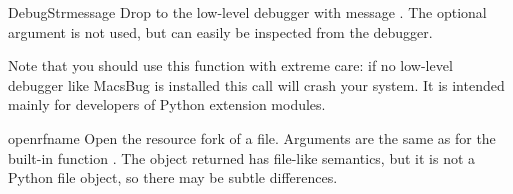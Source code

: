 \begin{funcdesc}{DebugStr}{message }
Drop to the low-level debugger with message . The
optional  argument is not used, but can easily be
inspected from the debugger.

Note that you should use this function with extreme care: if no
low-level debugger like MacsBug is installed this call will crash your
system. It is intended mainly for developers of Python extension
modules.
\end{funcdesc}

\begin{funcdesc}{openrf}{name }
Open the resource fork of a file. Arguments are the same as for the
built-in function . The object returned has file-like
semantics, but it is not a Python file object, so there may be subtle
differences.
\end{funcdesc}
